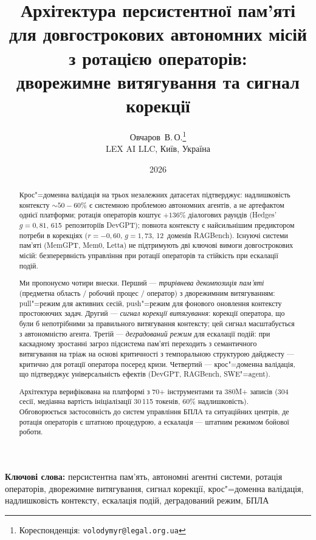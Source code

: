 \documentclass[11pt]{article}
\title{%
  Архітектура персистентної пам'яті \\
  для довгострокових автономних місій \\
  з ротацією операторів: \\
  дворежимне витягування та сигнал корекції%
}
\author{
  Овчаров~В.\,О.\thanks{Кореспонденція: \texttt{volodymyr@legal.org.ua}}\\
  LEX AI LLC, Київ, Україна
}
\date{2026}
\begin{document}
\maketitle

\begin{abstract}
Крос"=доменна валідація на трьох незалежних датасетах підтверджує: надлишковість контексту ${\sim}50{-}60\%$ є системною проблемою автономних агентів, а не артефактом однієї платформи; ротація операторів коштує $+136\%$ діалогових раундів (Hedges' $g{=}0{,}81$, 615~репозиторіїв DevGPT); повнота контексту є найсильнішим предиктором потреби в корекціях ($r{=}{-}0{,}60$, $g{=}1{,}73$, 12~доменів RAGBench).
Існуючі системи пам'яті (MemGPT, Mem0, Letta) не підтримують дві ключові вимоги довгострокових місій: безперервність управління при ротації операторів та стійкість при ескалації подій.

Ми пропонуємо чотири внески.
Перший --- \emph{трирівнева декомпозиція пам'яті} (предметна область / робочий процес / оператор) з дворежимним витягуванням: pull"=режим для активних сесій, push"=режим для фонового оновлення контексту простоюючих задач.
Другий --- \emph{сигнал корекції витягування}: корекції оператора, що були б непотрібними за правильного витягування контексту; цей сигнал масштабується з автономністю агента.
Третій --- \emph{деградований режим} для ескалації подій: при каскадному зростанні загроз підсистема пам'яті переходить з семантичного витягування на тріаж на основі критичності з темпоральною структурою дайджесту --- критично для ротації оператора посеред кризи.
Четвертий --- крос"=доменна валідація, що підтверджує універсальність ефектів (DevGPT, RAGBench, SWE"=agent).

Архітектура верифікована на платформі з 70+ інструментами та 380M+ записів (304 сесії, медіанна вартість ініціалізації 30\,115 токенів, 60\% надлишковість).
Обговорюється застосовність до систем управління БПЛА та ситуаційних центрів, де ротація операторів є штатною процедурою, а ескалація --- штатним режимом бойової роботи.
\end{abstract}

\medskip
\noindent\textbf{Ключові слова:} персистентна пам'ять, автономні агентні системи, ротація операторів, дворежимне витягування, сигнал корекції, крос"=доменна валідація, надлишковість контексту, ескалація подій, деградований режим, БПЛА

\end{document}
